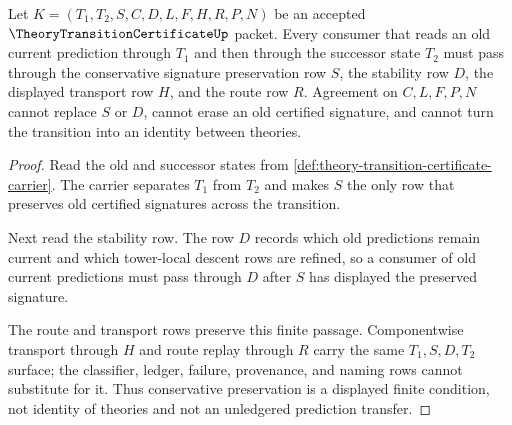 \begin{theorem}
\label{thm:theory-transition-certificate-conservative-preservation}
Let $K=(T_1,T_2,S,C,D,L,F,H,R,P,N)$ be an accepted $\TheoryTransitionCertificateUp$ packet. Every consumer that reads an old current prediction through $T_1$ and then through the successor state $T_2$ must pass through the conservative signature preservation row $S$, the stability row $D$, the displayed transport row $H$, and the route row $R$. Agreement on $C,L,F,P,N$ cannot replace $S$ or $D$, cannot erase an old certified signature, and cannot turn the transition into an identity between theories.
\end{theorem}
\begin{proof}
Read the old and successor states from \autoref{def:theory-transition-certificate-carrier}. The carrier separates $T_1$ from $T_2$ and makes $S$ the only row that preserves old certified signatures across the transition.

Next read the stability row. The row $D$ records which old predictions remain current and which tower-local descent rows are refined, so a consumer of old current predictions must pass through $D$ after $S$ has displayed the preserved signature.

The route and transport rows preserve this finite passage. Componentwise transport through $H$ and route replay through $R$ carry the same $T_1,S,D,T_2$ surface; the classifier, ledger, failure, provenance, and naming rows cannot substitute for it. Thus conservative preservation is a displayed finite condition, not identity of theories and not an unledgered prediction transfer.
\end{proof}

